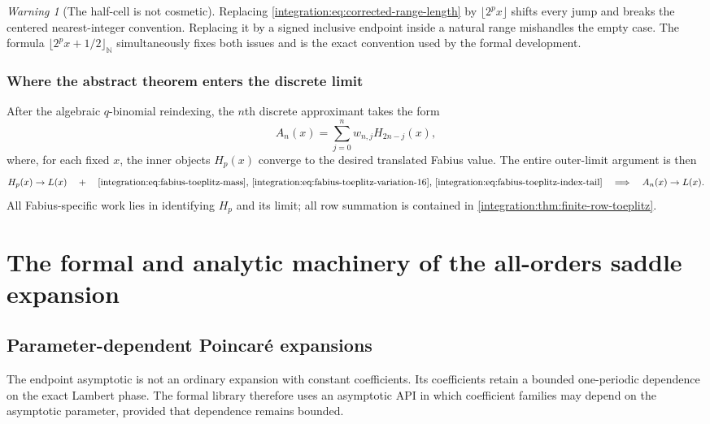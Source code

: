 \documentclass[11pt,oneside]{article}
\theoremstyle{definition}
\theoremstyle{remark}
\newtheorem{warning}[theorem]{Warning}
\newcommand{\N}{\mathbb N}
\begin{document}
\begin{warning}[The half-cell is not cosmetic]
Replacing \eqref{integration:eq:corrected-range-length} by $\lfloor2^px\rfloor$ shifts every jump and
breaks the centered nearest-integer convention.  Replacing it by a signed inclusive endpoint
inside a natural range mishandles the empty case.  The formula
$\lfloor2^px+1/2\rfloor_{\N}$ simultaneously fixes both issues and is the exact convention
used by the formal development.
\end{warning}

\subsubsection{Where the abstract theorem enters the discrete limit}

After the algebraic $q$-binomial reindexing, the $n$th discrete approximant takes the form
\begin{equation}
 A_n(x)=\sum_{j=0}^{n}w_{n,j}H_{2n-j}(x),
 \label{integration:eq:discrete-limit-toeplitz-form}
\end{equation}
where, for each fixed $x$, the inner objects $H_p(x)$ converge to the desired translated
Fabius value.  The entire outer-limit argument is then
\begin{equation*}
 H_p(x)\to L(x)
 \quad+\quad
 \text{\eqref{integration:eq:fabius-toeplitz-mass}, \eqref{integration:eq:fabius-toeplitz-variation-16},
 \eqref{integration:eq:fabius-toeplitz-index-tail}}
 \quad\Longrightarrow\quad
 A_n(x)\to L(x).
\end{equation*}
All Fabius-specific work lies in identifying $H_p$ and its limit; all row summation is
contained in \cref{integration:thm:finite-row-toeplitz}.

\section{The formal and analytic machinery of the all-orders saddle expansion}

\subsection{Parameter-dependent Poincar\'e expansions}
\label{integration:sec:poincare-api}

The endpoint asymptotic is not an ordinary expansion with constant coefficients.  Its
coefficients retain a bounded one-periodic dependence on the exact Lambert phase.  The
formal library therefore uses an asymptotic API in which coefficient families may depend on
the asymptotic parameter, provided that dependence remains bounded.
\end{document}
